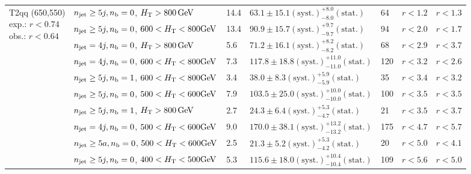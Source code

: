 \begin{table}[h!]
\begin{tabular}{ lllllll }
\multirow{10}{*}{\parbox[t]{2cm}{T2qq (650,550)\\exp.: $r<0.74$\\obs.: $r<0.64$}}
 & $n_{\mathrm{jet}} \geq5j,n_{\text{b}} =0$, $\mbox{$H_\text{T}$} > 800 \, \mathrm{GeV}$ & 14.4 & $63.1 \pm 15.1 \mathrm{(syst.)} ^{+8.0}_{-8.0} \mathrm{(stat.)}$ & 64 & $r < 1.2$ & $r < 1.3$\\ 
 & $n_{\mathrm{jet}} \geq5j,n_{\text{b}} =0$, $600 < \mbox{$H_\text{T}$} < 800 \mathrm{GeV}$ & 13.4 & $90.9 \pm 15.7 \mathrm{(syst.)} ^{+9.7}_{-9.7} \mathrm{(stat.)}$ & 94 & $r < 2.0$ & $r < 1.7$\\ 
 & $n_{\mathrm{jet}} =4j,n_{\text{b}} =0$, $\mbox{$H_\text{T}$} > 800 \, \mathrm{GeV}$ & 5.6 & $71.2 \pm 16.1 \mathrm{(syst.)} ^{+8.2}_{-8.2} \mathrm{(stat.)}$ & 68 & $r < 2.9$ & $r < 3.7$\\ 
 & $n_{\mathrm{jet}} =4j,n_{\text{b}} =0$, $600 < \mbox{$H_\text{T}$} < 800 \mathrm{GeV}$ & 7.3 & $117.8 \pm 18.8 \mathrm{(syst.)} ^{+11.0}_{-11.0} \mathrm{(stat.)}$ & 120 & $r < 3.2$ & $r < 2.6$\\ 
 & $n_{\mathrm{jet}} \geq5j,n_{\text{b}} =1$, $600 < \mbox{$H_\text{T}$} < 800 \mathrm{GeV}$ & 3.4 & $38.0 \pm 8.3 \mathrm{(syst.)} ^{+5.9}_{-5.9} \mathrm{(stat.)}$ & 35 & $r < 3.4$ & $r < 3.2$\\ 
 & $n_{\mathrm{jet}} \geq5j,n_{\text{b}} =0$, $500 < \mbox{$H_\text{T}$} < 600 \mathrm{GeV}$ & 7.9 & $103.5 \pm 25.0 \mathrm{(syst.)} ^{+10.0}_{-10.0} \mathrm{(stat.)}$ & 100 & $r < 3.5$ & $r < 3.5$\\ 
 & $n_{\mathrm{jet}} \geq5j,n_{\text{b}} =1$, $\mbox{$H_\text{T}$} > 800 \, \mathrm{GeV}$ & 2.7 & $24.3 \pm 6.4 \mathrm{(syst.)} ^{+5.3}_{-4.7} \mathrm{(stat.)}$ & 21 & $r < 3.5$ & $r < 3.7$\\ 
 & $n_{\mathrm{jet}} =4j,n_{\text{b}} =0$, $500 < \mbox{$H_\text{T}$} < 600 \mathrm{GeV}$ & 9.0 & $170.0 \pm 38.1 \mathrm{(syst.)} ^{+13.2}_{-13.2} \mathrm{(stat.)}$ & 175 & $r < 4.7$ & $r < 5.7$\\ 
 & $n_{\mathrm{jet}} \geq5a,n_{\text{b}} =0$, $500 < \mbox{$H_\text{T}$} < 600 \mathrm{GeV}$ & 2.5 & $21.3 \pm 5.2 \mathrm{(syst.)} ^{+5.3}_{-4.2} \mathrm{(stat.)}$ & 20 & $r < 5.0$ & $r < 4.1$\\ 
 & $n_{\mathrm{jet}} \geq5j,n_{\text{b}} =0$, $400 < \mbox{$H_\text{T}$} < 500 \mathrm{GeV}$ & 5.3 & $115.6 \pm 18.0 \mathrm{(syst.)} ^{+10.4}_{-10.4} \mathrm{(stat.)}$ & 109 & $r < 5.6$ & $r < 5.0$\\ \hline
    \hline
  \end{tabular}
\end{table}


